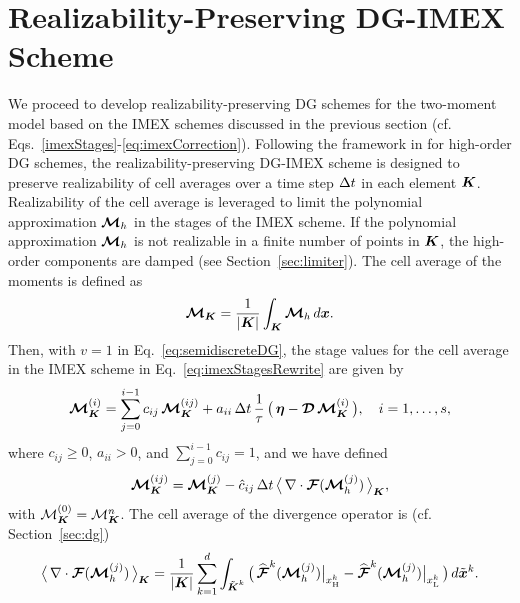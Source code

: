 \section{Realizability-Preserving DG-IMEX Scheme}
\label{sec:realizableDGIMEX}

We proceed to develop realizability-preserving DG schemes for the two-moment model based on the IMEX schemes discussed in the previous section (cf. Eqs.~\eqref{imexStages}-\eqref{eq:imexCorrection}).  
Following the framework in \cite{zhangShu_2010b} for high-order DG schemes, the realizability-preserving DG-IMEX scheme is designed to preserve realizability of cell averages over a time step $\Delta t$ in each element $\boldsymbol{K}$.  
Realizability of the cell average is leveraged to limit the polynomial approximation $\boldsymbol{\mathcal{M}}_{h}$ in the stages of the IMEX scheme.  
If the polynomial approximation $\boldsymbol{\mathcal{M}}_{h}$ is not realizable in a finite number of points in $\boldsymbol{K}$, the high-order components are damped (see Section~\ref{sec:limiter}).  
The cell average of the moments is defined as
\begin{equation}
  \boldsymbol{\mathcal{M}}_{\boldsymbol{K}}
  =\frac{1}{|\boldsymbol{K}|}\int_{\boldsymbol{K}}\boldsymbol{\mathcal{M}}_{h}\,d\boldsymbol{x}.  
\end{equation}
Then, with $v=1$ in Eq.~\eqref{eq:semidiscreteDG}, the stage values for the cell average in the IMEX scheme in Eq.~\eqref{eq:imexStagesRewrite} are given by
\begin{equation}
  \boldsymbol{\mathcal{M}}_{\boldsymbol{K}}^{(i)}
  =\sum_{j=0}^{i-1}c_{ij}\,\boldsymbol{\mathcal{M}}_{\boldsymbol{K}}^{(ij)}
  +a_{ii}\,\Delta t\,\frac{1}{\tau}\,\big(\,\boldsymbol{\eta}-\boldsymbol{\mathcal{D}}\,\boldsymbol{\mathcal{M}}_{\boldsymbol{K}}^{(i)}\,\big), \quad i=1,\ldots,s,
  \label{eq:imexStagesCellAverage}
\end{equation}
where $c_{ij}\ge0$, $a_{ii}>0$, and $\sum_{j=0}^{i-1}c_{ij}=1$, and we have defined
\begin{equation}
  \boldsymbol{\mathcal{M}}_{\boldsymbol{K}}^{(ij)}
  =\boldsymbol{\mathcal{M}}_{\boldsymbol{K}}^{(j)}-\hat{c}_{ij}\,\Delta t\,\big\langle\,\nabla\cdot\boldsymbol{\mathcal{F}}(\boldsymbol{\mathcal{M}}_{h}^{(j)})\,\big\rangle_{\boldsymbol{K}},
\end{equation}
with $\mathcal{M}_{\boldsymbol{K}}^{(0)}=\mathcal{M}_{\boldsymbol{K}}^{n}$.  
The cell average of the divergence operator is (cf. Section~\ref{sec:dg})
\begin{equation}
  \big\langle\,\nabla\cdot\boldsymbol{\mathcal{F}}(\boldsymbol{\mathcal{M}}_{h}^{(j)})\,\big\rangle_{\boldsymbol{K}}
  =\frac{1}{|\boldsymbol{K}|}\sum_{k=1}^{d}\int_{\tilde{\boldsymbol{K}}^{k}}
  \big(\,\widehat{\boldsymbol{\mathcal{F}}}^{k}(\boldsymbol{\mathcal{M}}_{h}^{(j)})\big|_{x_{\mbox{\tiny H}}^{k}}-\widehat{\boldsymbol{\mathcal{F}}}^{k}(\boldsymbol{\mathcal{M}}_{h}^{(j)})\big|_{x_{\mbox{\tiny L}}^{k}}\,\big)\,d\tilde{\boldsymbol{x}}^{k}.  
\end{equation}

